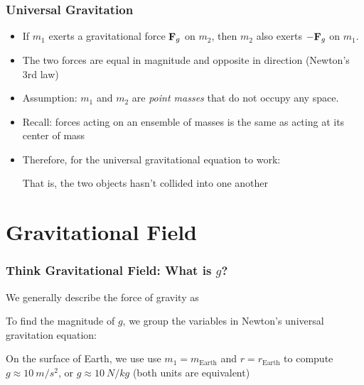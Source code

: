 \documentclass[12pt,compress,aspectratio=169]{beamer}
\newcommand{\mb}[1]{\ensuremath\mathbf{#1}}
\newcommand{\eq}[2]{\vspace{#1}{\Large\begin{displaymath}#2\end{displaymath}}}
\begin{document}
\begin{frame}
  \frametitle{Universal Gravitation}
  \begin{itemize}
  \item If $m_1$ exerts a gravitational force $\mb{F}_g$ on $m_2$, then $m_2$
    also exerts $-\mb{F}_g$ on $m_1$.
  \item The two forces are equal in magnitude and opposite in direction
    (Newton's 3rd law)
  \item Assumption: $m_1$ and $m_2$ are \emph{point masses}
    that do not occupy any space.
  \item Recall: forces acting on an ensemble of masses is the same as acting at
    its center of mass
  \item Therefore, for the universal gravitational equation to work:
    
    \eq{-.2in}{
      r>(r_1+r_2)
    }
    That is, the two objects hasn't collided into one another
  \end{itemize}
\end{frame}


\section{Gravitational Field}


\begin{frame}
  \frametitle{Think Gravitational Field: What is $g$?}

  We generally describe the force of gravity as
  
  \eq{-.25in}{
    \mb{F}_g=m\mb{g}
  }

  \vspace{-.2in}To find the magnitude of $g$, we group the variables in Newton's
  universal gravitation equation:
    
  \eq{-.2in}{
    F_g=\underbrace{\left[\frac{Gm_1}{r^2}\right]}_{=g}m_2=m_2g
  }

  \vspace{-.1in}On the surface of Earth, we use use $m_1=m_\mathrm{Earth}$ and
  $r=r_\mathrm{Earth}$ to compute $g\approx\SI{10}{m/s^2}$, or
  $g\approx\SI{10}{N/kg}$ (both units are equivalent)
\end{frame}
\end{document}
